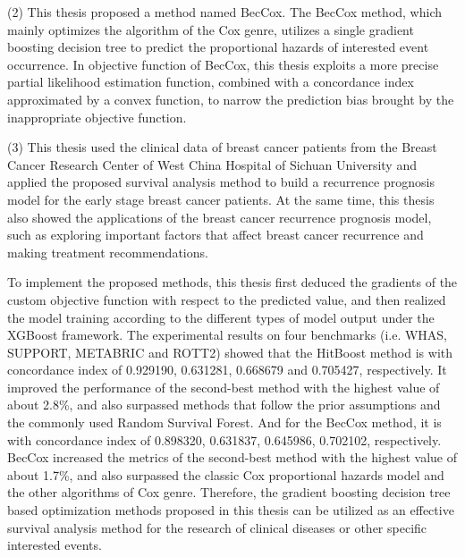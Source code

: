 \begin{englishabstract}
    (2) This thesis proposed a method named BecCox. The BecCox method, which mainly optimizes the algorithm of the Cox genre, utilizes a single gradient boosting decision tree to predict the proportional hazards of interested event occurrence. In objective function of BecCox, this thesis exploits a more precise partial likelihood estimation function, combined with a concordance index approximated by a convex function, to narrow the prediction bias brought by the inappropriate objective function.
    
    (3) This thesis used the clinical data of breast cancer patients from the Breast Cancer Research Center of West China Hospital of Sichuan University and applied the proposed survival analysis method to build a recurrence prognosis model for the early stage breast cancer patients. At the same time, this thesis also showed the applications of the breast cancer recurrence prognosis model, such as exploring important factors that affect breast cancer recurrence and making treatment recommendations.

	To implement the proposed methods, this thesis first deduced the gradients of the custom objective function with respect to the predicted value, and then realized the model training according to the different types of model output under the XGBoost framework. The experimental results on four benchmarks (i.e. WHAS, SUPPORT, METABRIC and ROTT2) showed that the HitBoost method is with concordance index of 0.929190, 0.631281, 0.668679 and 0.705427, respectively. It improved the performance of the second-best method with the highest value of about 2.8\%, and also surpassed methods that follow the prior assumptions and the commonly used Random Survival Forest. And for the BecCox method, it is with concordance index of 0.898320, 0.631837, 0.645986, 0.702102, respectively. BecCox increased the metrics of the second-best method with the highest value of about 1.7\%, and also surpassed the classic Cox proportional hazards model and the other algorithms of Cox genre. Therefore, the gradient boosting decision tree based optimization methods proposed in this thesis can be utilized as an effective survival analysis method for the research of clinical diseases or other specific interested events.

\end{englishabstract}


